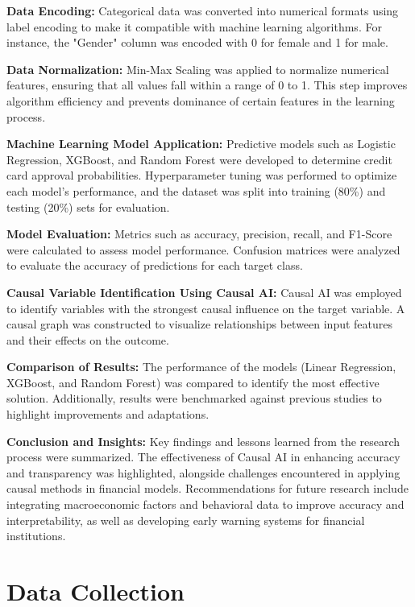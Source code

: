 \documentclass[12pt]{report}
\begin{document}
    {\bfseries Data Encoding:} Categorical data was converted into numerical formats using label encoding to make it compatible with machine learning algorithms. For instance, the "Gender" column was encoded with 0 for female and 1 for male.

    {\bfseries Data Normalization:} Min-Max Scaling was applied to normalize numerical features, ensuring that all values fall within a range of 0 to 1. This step improves algorithm efficiency and prevents dominance of certain features in the learning process.
    
    {\bfseries Machine Learning Model Application:} Predictive models such as Logistic Regression, XGBoost, and Random Forest were developed to determine credit card approval probabilities. Hyperparameter tuning was performed to optimize each model’s performance, and the dataset was split into training (80\%) and testing (20\%) sets for evaluation.

    {\bfseries Model Evaluation:} Metrics such as accuracy, precision, recall, and F1-Score were calculated to assess model performance. Confusion matrices were analyzed to evaluate the accuracy of predictions for each target class.

    {\bfseries Causal Variable Identification Using Causal AI:} Causal AI was employed to identify variables with the strongest causal influence on the target variable. A causal graph was constructed to visualize relationships between input features and their effects on the outcome.

    {\bfseries Comparison of Results:} The performance of the models (Linear Regression, XGBoost, and Random Forest) was compared to identify the most effective solution. Additionally, results were benchmarked against previous studies to highlight improvements and adaptations.

    {\bfseries Conclusion and Insights:} Key findings and lessons learned from the research process were summarized. The effectiveness of Causal AI in enhancing accuracy and transparency was highlighted, alongside challenges encountered in applying causal methods in financial models. Recommendations for future research include integrating macroeconomic factors and behavioral data to improve accuracy and interpretability, as well as developing early warning systems for financial institutions.

    \section{Data Collection}
\end{document}
